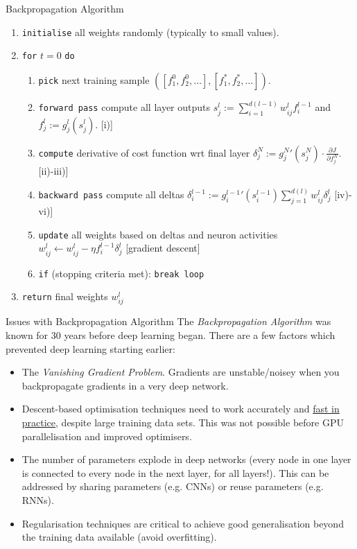 \documentclass[11pt,a4paper]{article}
\begin{document}
\begin{proposition}{Backpropagation Algorithm}
  \begin{enumerate}
    \item \texttt{initialise} all weights randomly (typically to small values).
    \item \texttt{for} $t=0$ \texttt{do}
    \begin{enumerate}
      \item \texttt{pick} next training sample $([f_1^0,f_2^0,\dots],[f_1^*,f_2^*,\dots])$.
      \item \texttt{forward pass} compute all layer outputs $\displaystyle s_j^l:=\sum_{i=1}^{d(l-1)}w_{ij}^lf_i^{l-1}$ and $\displaystyle f_j^l:=g_j^l(s_j^l)$. [i)]
      \item \texttt{compute} derivative of cost function wrt final layer $\delta_j^N:=g_j^N'(s_j^N)\cdot \frac{\partial J}{\partial f_j^N}$. [ii)-iii)]
      \item \texttt{backward pass} compute all deltas $\delta_i^{l-1}:=\displaystyle g_i^{l-1}'(s_i^{l-1})\sum_{j=1}^{d(l)}w_{ij}^l\delta_j^l$ [iv)-vi)]
      \item \texttt{update} all weights based on deltas and neuron activities $w_{ij}^l\leftarrow w_{ij}^l-\eta f_i^{l-1}\delta_j^l$ [gradient descent]
      \item \texttt{if} (stopping criteria met): \texttt{break loop}
    \end{enumerate}
    \item \texttt{return} final weights $w_{ij}^l$
  \end{enumerate}
\end{proposition}

\begin{remark}{Issues with Backpropagation Algorithm}
  The \textit{Backpropagation Algorithm} was known for 30 years before deep learning began. There are a few factors which prevented deep learning starting earlier:
  \begin{itemize}
    \item The \textit{Vanishing Gradient Problem}. Gradients are unstable/noisey when you backpropagate gradients in a very deep network.
    \item Descent-based optimisation techniques need to work accurately and \underline{fast in practice}, despite large training data sets. This was not possible before GPU parallelisation and improved optimisers.
    \item The number of parameters explode in deep networks (every node in one layer is connected to every node in the next layer, for all layers!). This can be addressed by sharing parameters (e.g. CNNs) or reuse parameters (e.g. RNNs).
    \item Regularisation techniques are critical to achieve good generalisation beyond the training data available (avoid overfitting).
  \end{itemize}
\end{remark}
\end{document}
